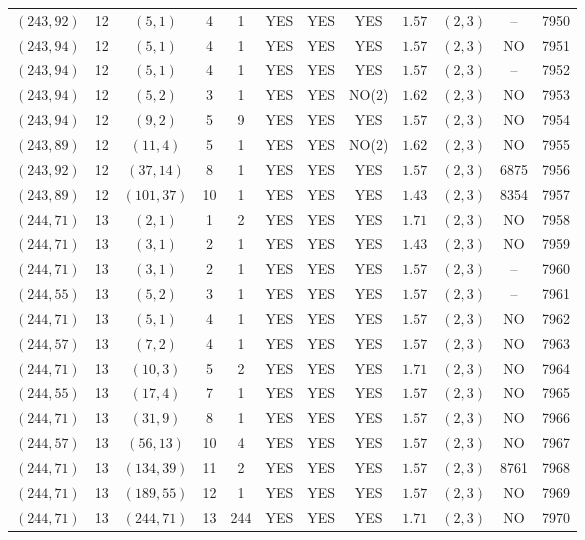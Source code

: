 \begin{longtable}{|c|c|c|c|c|c|c|c|c|c|c|c|}
$(243,92)$ & 12 & $(5,1)$ & 4 & 1 & YES & YES & YES & $1.57$ & $(2,3)$ & -- & 7950\\
$(243,94)$ & 12 & $(5,1)$ & 4 & 1 & YES & YES & YES & $1.57$ & $(2,3)$ & NO & 7951\\
$(243,94)$ & 12 & $(5,1)$ & 4 & 1 & YES & YES & YES & $1.57$ & $(2,3)$ & -- & 7952\\
$(243,94)$ & 12 & $(5,2)$ & 3 & 1 & YES & YES & NO(2) & $1.62$ & $(2,3)$ & NO & 7953\\
$(243,94)$ & 12 & $(9,2)$ & 5 & 9 & YES & YES & YES & $1.57$ & $(2,3)$ & NO & 7954\\
$(243,89)$ & 12 & $(11,4)$ & 5 & 1 & YES & YES & NO(2) & $1.62$ & $(2,3)$ & NO & 7955\\
$(243,92)$ & 12 & $(37,14)$ & 8 & 1 & YES & YES & YES & $1.57$ & $(2,3)$ & 6875 & 7956\\
$(243,89)$ & 12 & $(101,37)$ & 10 & 1 & YES & YES & YES & $1.43$ & $(2,3)$ & 8354 & 7957\\
$(244,71)$ & 13 & $(2,1)$ & 1 & 2 & YES & YES & YES & $1.71$ & $(2,3)$ & NO & 7958\\
$(244,71)$ & 13 & $(3,1)$ & 2 & 1 & YES & YES & YES & $1.43$ & $(2,3)$ & NO & 7959\\
$(244,71)$ & 13 & $(3,1)$ & 2 & 1 & YES & YES & YES & $1.57$ & $(2,3)$ & -- & 7960\\
$(244,55)$ & 13 & $(5,2)$ & 3 & 1 & YES & YES & YES & $1.57$ & $(2,3)$ & -- & 7961\\
$(244,71)$ & 13 & $(5,1)$ & 4 & 1 & YES & YES & YES & $1.57$ & $(2,3)$ & NO & 7962\\
$(244,57)$ & 13 & $(7,2)$ & 4 & 1 & YES & YES & YES & $1.57$ & $(2,3)$ & NO & 7963\\
$(244,71)$ & 13 & $(10,3)$ & 5 & 2 & YES & YES & YES & $1.71$ & $(2,3)$ & NO & 7964\\
$(244,55)$ & 13 & $(17,4)$ & 7 & 1 & YES & YES & YES & $1.57$ & $(2,3)$ & NO & 7965\\
$(244,71)$ & 13 & $(31,9)$ & 8 & 1 & YES & YES & YES & $1.57$ & $(2,3)$ & NO & 7966\\
$(244,57)$ & 13 & $(56,13)$ & 10 & 4 & YES & YES & YES & $1.57$ & $(2,3)$ & NO & 7967\\
$(244,71)$ & 13 & $(134,39)$ & 11 & 2 & YES & YES & YES & $1.57$ & $(2,3)$ & 8761 & 7968\\
$(244,71)$ & 13 & $(189,55)$ & 12 & 1 & YES & YES & YES & $1.57$ & $(2,3)$ & NO & 7969\\
$(244,71)$ & 13 & $(244,71)$ & 13 & 244 & YES & YES & YES & $1.71$ & $(2,3)$ & NO & 7970\\

\end{longtable}
